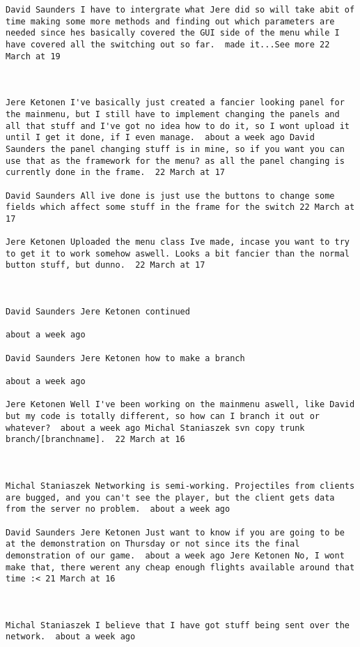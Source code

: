 \begin{verbatim}
David Saunders I have to intergrate what Jere did so will take abit of
time making some more methods and finding out which parameters are
needed since hes basically covered the GUI side of the menu while I
have covered all the switching out so far.  made it...See more 22
March at 19



Jere Ketonen I've basically just created a fancier looking panel for
the mainmenu, but I still have to implement changing the panels and
all that stuff and I've got no idea how to do it, so I wont upload it
until I get it done, if I even manage.  about a week ago David
Saunders the panel changing stuff is in mine, so if you want you can
use that as the framework for the menu? as all the panel changing is
currently done in the frame.  22 March at 17

David Saunders All ive done is just use the buttons to change some
fields which affect some stuff in the frame for the switch 22 March at
17

Jere Ketonen Uploaded the menu class Ive made, incase you want to try
to get it to work somehow aswell. Looks a bit fancier than the normal
button stuff, but dunno.  22 March at 17



David Saunders Jere Ketonen continued

about a week ago

David Saunders Jere Ketonen how to make a branch

about a week ago

Jere Ketonen Well I've been working on the mainmenu aswell, like David
but my code is totally different, so how can I branch it out or
whatever?  about a week ago Michal Staniaszek svn copy trunk
branch/[branchname].  22 March at 16



Michal Staniaszek Networking is semi-working. Projectiles from clients
are bugged, and you can't see the player, but the client gets data
from the server no problem.  about a week ago

David Saunders Jere Ketonen Just want to know if you are going to be
at the demonstration on Thursday or not since its the final
demonstration of our game.  about a week ago Jere Ketonen No, I wont
make that, there werent any cheap enough flights available around that
time :< 21 March at 16



Michal Staniaszek I believe that I have got stuff being sent over the
network.  about a week ago


\end{verbatim}
